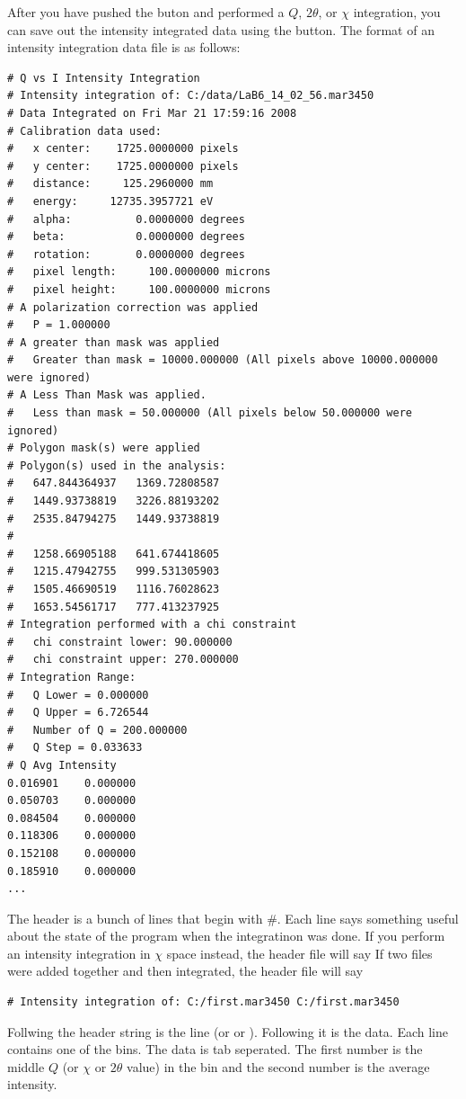 After you have pushed the  buton
and performed a $Q$, $2\theta$, or $\chi$ integration,
you can save out the intensity integrated data
using the  button. The format of 
an intensity integration data file is as follows:
\begin{lstlisting}[caption={'A Cake Data File'}]
# Q vs I Intensity Integration
# Intensity integration of: C:/data/LaB6_14_02_56.mar3450 
# Data Integrated on Fri Mar 21 17:59:16 2008
# Calibration data used:
#   x center:    1725.0000000 pixels
#   y center:    1725.0000000 pixels
#   distance:     125.2960000 mm
#   energy:     12735.3957721 eV
#   alpha:          0.0000000 degrees
#   beta:           0.0000000 degrees
#   rotation:       0.0000000 degrees
#   pixel length:     100.0000000 microns
#   pixel height:     100.0000000 microns
# A polarization correction was applied
#   P = 1.000000
# A greater than mask was applied
#   Greater than mask = 10000.000000 (All pixels above 10000.000000 were ignored)
# A Less Than Mask was applied.
#   Less than mask = 50.000000 (All pixels below 50.000000 were ignored)
# Polygon mask(s) were applied
# Polygon(s) used in the analysis:
#   647.844364937	1369.72808587
#   1449.93738819	3226.88193202
#   2535.84794275	1449.93738819
#
#   1258.66905188	641.674418605
#   1215.47942755	999.531305903
#   1505.46690519	1116.76028623
#   1653.54561717	777.413237925
# Integration performed with a chi constraint
#   chi constraint lower: 90.000000
#   chi constraint upper: 270.000000
# Integration Range:
#   Q Lower = 0.000000
#   Q Upper = 6.726544
#   Number of Q = 200.000000
#   Q Step = 0.033633
# Q	Avg Intensity
0.016901	0.000000
0.050703	0.000000
0.084504	0.000000
0.118306	0.000000
0.152108	0.000000
0.185910	0.000000
...
\end{lstlisting}
The header is a bunch of lines that begin with \#.
Each line says something useful about the state
of the program when the integratinon was
done. 
If you perform an intensity integration in $\chi$
space instead, the header file will say
If two files were added together
and then integrated, the header file will say
\begin{lstlisting}[caption={'Alternate Header'}]
# Intensity integration of: C:/first.mar3450 C:/first.mar3450
\end{lstlisting}
Follwing the header string is the line
 (or 
or ). Following it is
the data. Each line contains one of the bins. The data
is tab seperated. The first number is the middle $Q$ (or
$\chi$ or $2\theta$ value) in the bin and the second number
is the average intensity.



